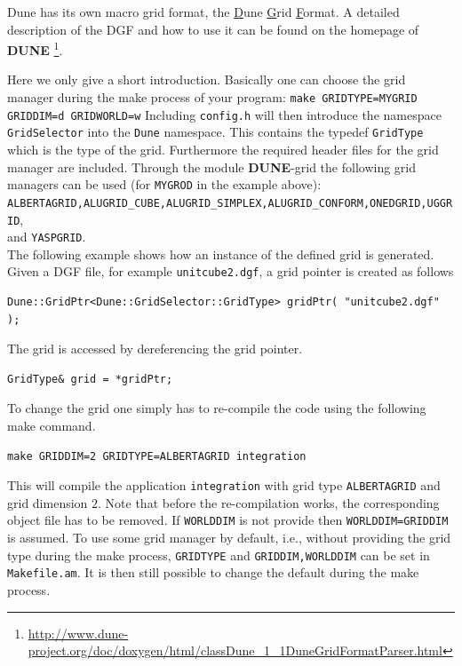 \documentclass[11pt,a4paper,headinclude,footinclude,DIV16,headings=normal]{scrreprt}
\newcommand{\Dune}{{\sffamily\bfseries DUNE}\xspace}
\begin{document}
Dune has its own macro grid format, the \underline{D}une \underline{G}rid \underline{F}ormat.
A detailed description of the DGF and how to use it can be found on the
homepage of \Dune%
\footnote{\url{http://www.dune-project.org/doc/doxygen/html/classDune_1_1DuneGridFormatParser.html}}.

Here we only give a short introduction.
Basically one can choose the grid manager during the make process of
your program:
\lstinline!make GRIDTYPE=MYGRID GRIDDIM=d GRIDWORLD=w!
Including \lstinline!config.h! will then
introduce the namespace \lstinline!GridSelector! into the
\lstinline!Dune! namespace. This contains the typedef
\lstinline!GridType! which is the type of the grid. Furthermore the
required header files for the grid manager are included.
Through the module \Dune{}-grid the following grid managers can be used
(for \lstinline!MYGROD! in the example above):
\\
\lstinline!ALBERTAGRID,ALUGRID_CUBE,ALUGRID_SIMPLEX,ALUGRID_CONFORM,ONEDGRID,UGGRID!,
\\
and \lstinline!YASPGRID!.
\\
The following example shows how an
instance of the defined grid is generated. Given a DGF file, for example
\lstinline!unitcube2.dgf!, a grid pointer is created as follows
\begin{lstlisting}[basicstyle=\ttfamily\scriptsize]
Dune::GridPtr<Dune::GridSelector::GridType> gridPtr( "unitcube2.dgf" );
\end{lstlisting}
The grid is accessed by dereferencing the grid pointer.
\begin{lstlisting}[basicstyle=\ttfamily\scriptsize]
GridType& grid = *gridPtr;
\end{lstlisting}
To change the grid one simply has to re-compile the code using the following make command.
\begin{lstlisting}[basicstyle=\ttfamily\scriptsize]
make GRIDDIM=2 GRIDTYPE=ALBERTAGRID integration
\end{lstlisting}
This will compile the application \texttt{integration} with grid type \lstinline!ALBERTAGRID! and grid dimension $2$.
Note that before the re-compilation works,
the corresponding object file has to be removed.
If \lstinline!WORLDDIM! is not
provide then \lstinline!WORLDDIM=GRIDDIM! is assumed.
To use some grid manager by default, i.e., without providing the grid type
during the make process, \lstinline!GRIDTYPE! and
\lstinline!GRIDDIM,WORLDDIM! can be set in \lstinline!Makefile.am!. It is
then still possible to change the default during the make process.
\end{document}
